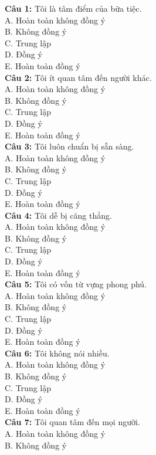 \begin{multicols}{2}
\noindent
\textbf{Câu 1:} Tôi là tâm điểm của bữa tiệc. \\
A. Hoàn toàn không đồng ý \\
B. Không đồng ý \\
C. Trung lập \\
D. Đồng ý \\
E. Hoàn toàn đồng ý \\
\textbf{Câu 2:} Tôi ít quan tâm đến người khác. \\
A. Hoàn toàn không đồng ý \\
B. Không đồng ý \\
C. Trung lập \\
D. Đồng ý \\
E. Hoàn toàn đồng ý \\
\textbf{Câu 3:} Tôi luôn chuẩn bị sẵn sàng. \\
A. Hoàn toàn không đồng ý \\
B. Không đồng ý \\
C. Trung lập \\
D. Đồng ý \\
E. Hoàn toàn đồng ý \\
\textbf{Câu 4:} Tôi dễ bị căng thẳng. \\
A. Hoàn toàn không đồng ý \\
B. Không đồng ý \\
C. Trung lập \\
D. Đồng ý \\
E. Hoàn toàn đồng ý \\
\textbf{Câu 5:} Tôi có vốn từ vựng phong phú. \\
A. Hoàn toàn không đồng ý \\
B. Không đồng ý \\
C. Trung lập \\
D. Đồng ý \\
E. Hoàn toàn đồng ý \\
\textbf{Câu 6:} Tôi không nói nhiều. \\
A. Hoàn toàn không đồng ý \\
B. Không đồng ý \\
C. Trung lập \\
D. Đồng ý \\
E. Hoàn toàn đồng ý \\
\textbf{Câu 7:} Tôi quan tâm đến mọi người. \\
A. Hoàn toàn không đồng ý \\
B. Không đồng ý \\

\end{multicols}
